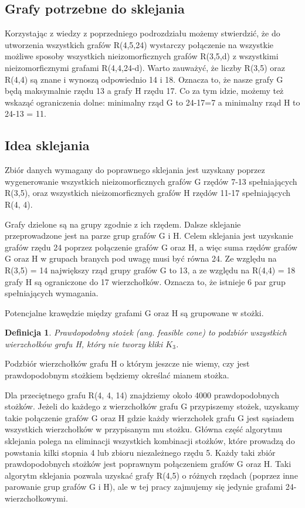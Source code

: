 \documentclass[11pt]{article}
\newtheorem{definition}{Definicja}[section]
\begin{document}
\subsection{Grafy potrzebne do sklejania}

Korzystając z wiedzy z poprzedniego podrozdziału możemy stwierdzić, że do utworzenia wszystkich grafów R(4,5,24) wystarczy połączenie na wszystkie możliwe sposoby
wszystkich nieizomorficznych grafów R(3,5,d) z wszystkimi nieizomorficznymi grafami R(4,4,24-d). 
Warto zauważyć, że liczby R(3,5) oraz R(4,4) są znane i wynoszą odpowiednio 14 i 18. Oznacza to, że nasze grafy G będą maksymalnie rzędu 13 a grafy H rzędu 17. Co za tym idzie, możemy też wskaząć ograniczenia dolne:
minimalny rząd G to 24-17=7 a minimalny rząd H to 24-13 = 11.  

\subsection{Idea sklejania}
Zbiór danych wymagany do poprawnego sklejania jest uzyskany poprzez wygenerowanie wszystkich nieizomorficznych grafów G rzędów 7-13 spełniających R(3,5), oraz wszystkich nieizomorficznych grafów H rzędów 11-17 spełniających R(4, 4).

Grafy dzielone są na grupy zgodnie z ich rzędem. Dalsze sklejanie przeprowadzone jest na parze grup grafów G i H. Celem sklejania jest uzyskanie grafów rzędu 24 poprzez połączenie grafów G oraz H, a więc suma rzędów grafów G oraz H w grupach branych pod uwagę musi być równa 24. Ze względu na R(3,5) = 14 największy rząd grupy grafów G to 13, a ze względu na R(4,4) = 18 grafy H są ograniczone do 17 wierzchołków. Oznacza to, że istnieje 6 par grup spełniających wymagania.

Potencjalne krawędzie między grafami G oraz H są grupowane w stożki.

\begin{definition}
Prawdopodobny stożek (ang. feasible cone) to podzbiór wszystkich wierzchołków grafu H, który nie tworzy kliki $K_3$\cite{mainpaper}. 
\end{definition}

Podzbiór wierzchołków grafu H o którym jeszcze nie wiemy, czy jest prawdopodobnym stożkiem będziemy  określać mianem stożka.

Dla przeciętnego grafu R(4, 4, 14) znajdziemy około 4000 prawdopodobnych stożków. Jeżeli do każdego z wierzchołków grafu G przypiszemy stożek, uzyskamy takie połączenie grafów G oraz H gdzie każdy wierzchołek grafu G jest sąsiadem wszystkich wierzchołków w przypisanym mu stożku. Główna część algorytmu sklejania polega na eliminacji wszystkich kombinacji stożków, które prowadzą do powstania kilki stopnia 4 lub zbioru niezależnego rzędu 5. Każdy taki zbiór prawdopodobnych stożków jest poprawnym połączeniem grafów G oraz H. Taki algorytm sklejania pozwala uzyskać grafy R(4,5) o różnych rzędach (poprzez inne parowanie grup grafów G i H), ale w tej pracy zajmujemy się jedynie grafami 24-wierzchołkowymi.
\end{document}
